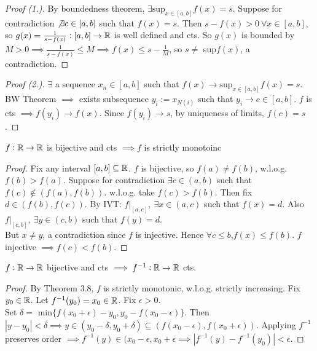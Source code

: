 \begin{proof}[Proof (1.)]
	By boundedness theorem, $\exists \displaystyle{\text{sup}_{x \in [a,b]}} f(x) = s$. Suppose for contradiction $\not \exists c \in [a,b]$ such that $f(x) = s$. Then $s-f(x) > 0 ~\forall x \in [a,b],$ so $g(x) = \frac{1}{s-f(x)}: [a,b] \to \mathbb{R}$ is well defined and cts. So $g(x)$ is bounded by $M > 0 \implies \frac{1}{s-f(x)} \leq M \implies f(x) \leq s - \frac{1}{M}$, so $s \neq$ sup$f(x)$, a contradiction.
\end{proof}\vspace*{5pt}
\begin{proof}[Proof (2.)]
	$\exists$ a sequence $x_n \in [a,b]$ such that $f(x) \to  \displaystyle{\text{sup}_{x \in [a,b]}} f(x) = s$. BW Theorem $\implies$ exists subsequence $y_i := x_{N(i)}$ such that $y_i \to c \in [a,b].$ $f$ is cts $\implies f(y_i) \to f(x)$. Since $f(y_i) \to s$, by uniqueness of limits, $f(c) = s$.
	\end{proof}\vspace*{5pt}


\begin{theorem}
$f:\mathbb{R} \to \mathbb{R}$ is bijective and cts $\implies f$ is strictly monotoinc	
\end{theorem}
\begin{proof}
Fix any interval $[a,b] \subseteq \mathbb{R}$. $f$ is bijective, so $f(a) \neq f(b)$, w.l.o.g. $f(b) > f(a).$ Suppose for contradiction $\exists c \in (a,b)$ such that $f(c) \not\in (f(a),f(b)).$ w.l.o.g. take $f(c) > f(b)$. Then fix $d \in (f(b),f(c))$. By IVT: $f|_{[a,c]}, ~\exists x \in (a,c)$ such that $f(x) = d$. Also  $f|_{[c,b]}, ~\exists y \in (c,b)$ such that $f(y) = d$.\\
But $x \neq y$, a contradiction since $f$ is injective. Hence $\forall c \leq b$,$f(x) \leq f(b)$. $f$ injective $\implies f(c) < f(b)$. 
\end{proof}\vspace*{5pt}

\vspace*{5pt}

\begin{theorem}
	$f: \mathbb{R} \to \mathbb{R}$ bijective and cts $\implies f^{-1}: \mathbb{R} \to \mathbb{R}$ cts.
\end{theorem}
\begin{proof}
By Theorem 3.8, $f$ is strictly monotonic, w.l.o.g. strictly increasing. Fix $y_0 \in \mathbb{R}$. Let $f^{-1}(y_0) = x_0 \in \mathbb{R}$. Fix $\epsilon > 0$.\\ Set $\delta =$ min$\{f(x_0 + \epsilon) - y_0, y_0 - f(x_0 - \epsilon)\}$. Then $|y -  y_0| < \delta \implies y \in (y_0 -\delta, y_0 + \delta) \subseteq (f(x_0 - \epsilon), f(x_0 + \epsilon))$. Applying $f^{-1}$ preserves order $\implies f^{-1}(y) \in (x_0 - \epsilon, x_0 + \epsilon\implies |f^{-1}(y) - f^{-1}(y_0)| < \epsilon$.  	
\end{proof}\vspace*{5pt}


